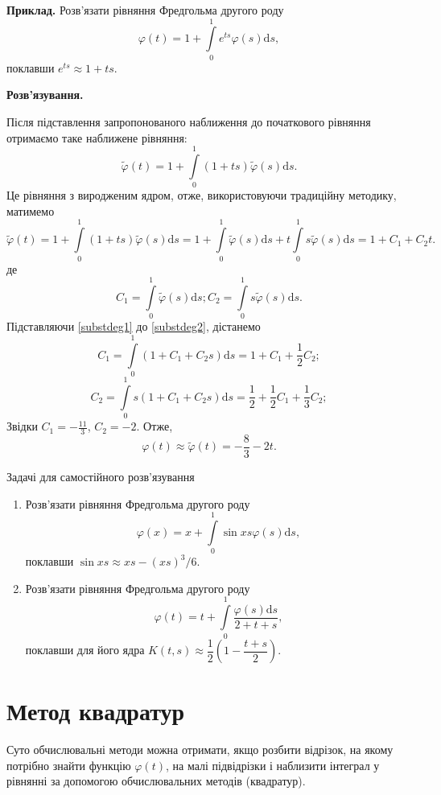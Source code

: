 \documentclass[14pt,twoside]{extreport}
\theoremstyle{mystyle}
\newcommand{\problems}{\bigskip\noindent\fbox{\HandPencilLeft}\hspace{6pt}\textsf{Задачі
		для самостійного розв'язування}}
\numberwithin{equation}{chapter}
\begin{document}
\begin{small}
 \textbf{Приклад.}
 Розв'язати рівняння Фредгольма другого роду
  \[
   \varphi(t)=1+\int\limits_{0}^{1}e^{ts}\varphi(s)\mathrm{d}s,
  \]
 поклавши $e^{ts}\approx 1+ts$.

 \textbf{Розв'язування.}

 Після підставлення запропонованого наближення до початкового рівняння отримаємо таке наближене рівняння:
 \[
  \tilde{\varphi}(t)=1+\int\limits_{0}^{1}(1+ts)\tilde{\varphi}(s)\mathrm{d}s.
 \]
 Це рівняння з виродженим ядром, отже, використовуючи традиційну методику, матимемо
 \begin{equation}\label{substdeg1}
  \tilde{\varphi}(t)=1+\int\limits_{0}^{1}(1+ts)\tilde{\varphi}(s)\mathrm{d}s = 1+\int\limits_{0}^{1}\tilde{\varphi}(s)\mathrm{d}s + t\int\limits_{0}^{1} s\tilde{\varphi}(s)\mathrm{d}s = 1 + C_1 + C_2t.
 \end{equation}
 де
 \begin{equation}\label{substdeg2}
  C_1=\int\limits_{0}^{1}\tilde{\varphi}(s)\mathrm{d}s; C_2=\int\limits_{0}^{1}s\tilde{\varphi}(s)\mathrm{d}s.
 \end{equation}
 Підставляючи \eqref{substdeg1} до \eqref{substdeg2}, дістанемо
 \[
  C_1 = \int\limits_{0}^{1}\left(1 + C_1 + C_2s\right)\mathrm{d}s = 1 + C_1 + \frac{1}{2}C_2;
 \]
 \[
  C_2 = \int\limits_{0}^{1}s\left(1 + C_1 + C_2s\right)\mathrm{d}s = \frac{1}{2} + \frac{1}{2}C_1 + \frac{1}{3}C_2;
 \]
 Звідки $C_1=-\frac{11}{3}$, $C_2=-2$. Отже,
 \[
  \varphi(t)\approx\tilde{\varphi}(t) = -\dfrac{8}{3} - 2t.
 \]

\problems
\begin{enumerate}
  \item Розв'язати рівняння Фредгольма другого роду
  \[
   \varphi(x)=x+\int\limits_{0}^{1}\sin{xs}\varphi(s)\mathrm{d}s,
  \]
 поклавши $\sin{xs}\approx xs-(xs)^3/6$.
 \item Розв'язати рівняння Фредгольма другого роду
  \[
   \varphi(t)=t+\int\limits_{0}^{1}\dfrac{\varphi(s)\mathrm{d}s}{2+t+s},
  \]
 поклавши для його ядра $K(t,s) \approx \dfrac{1}{2}\left(1-\dfrac{t+s}{2}\right)$.
\end{enumerate}
\end{small}

\section{Метод квадратур}

Суто обчислювальні методи можна отримати, якщо розбити відрізок, на якому потрібно знайти функцію $\varphi(t)$, на малі підвідрізки і наблизити інтеграл у рівнянні за допомогою обчислювальних методів (квадратур).
\end{document}
